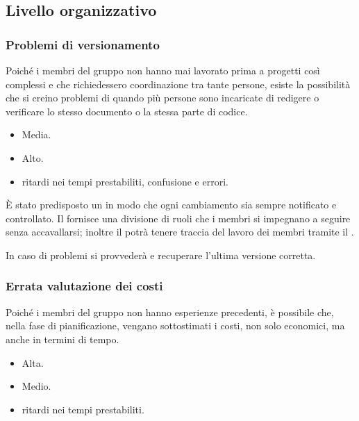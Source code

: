 \documentclass[a4paper, titlepage]{article}
\begin{document}
	
	\subsection{Livello organizzativo}
	\subsubsection{Problemi di versionamento}
	Poiché i membri del gruppo non hanno mai lavorato prima a progetti così complessi e che richiedessero coordinazione tra tante persone, esiste la possibilità che si creino problemi di  quando più persone sono incaricate di redigere o verificare lo stesso documento o la stessa parte di codice.
	
	\begin{itemize}
		\item {} Media.
		\item {} Alto.
		\item {} ritardi nei tempi prestabiliti, confusione e errori.
	\end{itemize}
	
	È stato predisposto un  in modo che ogni cambiamento sia sempre notificato e controllato. Il  fornisce una divisione di ruoli che i membri si impegnano a seguire senza accavallarsi; inoltre il  potrà tenere traccia del lavoro dei membri tramite il  .
	
	In caso di problemi si provvederà e recuperare l'ultima versione corretta.
	
	
	\subsubsection{Errata valutazione dei costi}
	Poiché i membri del gruppo non hanno esperienze precedenti, è possibile che, nella fase di pianificazione, vengano sottostimati i costi, non solo economici, ma anche in termini di tempo.
	
	\begin{itemize}
		\item {} Alta.
		\item {} Medio.
		\item {} ritardi nei tempi prestabiliti.
	\end{itemize}
	
\end{document}
